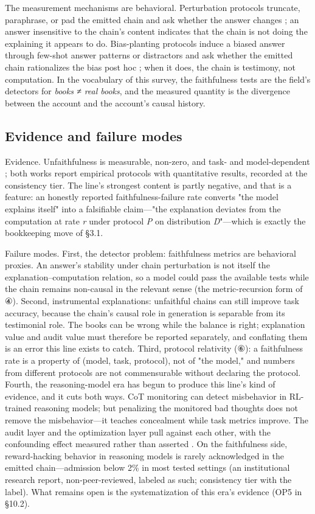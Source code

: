 \documentclass[11pt,a4paper]{article}
\begin{document}
The measurement mechanisms are behavioral. Perturbation protocols truncate, paraphrase, or pad the emitted chain and ask whether the answer changes \cite{key03}; an answer insensitive to the chain's content indicates that the chain is not doing the explaining it appears to do. Bias-planting protocols induce a biased answer through few-shot answer patterns or distractors and ask whether the emitted chain rationalizes the bias post hoc \cite{key02}; when it does, the chain is testimony, not computation. In the vocabulary of this survey, the faithfulness tests are the field's detectors for \textit{books ≠ real books}, and the measured quantity is the divergence between the account and the account's causal history.

\subsection{Evidence and failure modes}

Evidence. Unfaithfulness is measurable, non-zero, and task- and model-dependent \cite{key02,key03}; both works report empirical protocols with quantitative results, recorded at the consistency tier. The line's strongest content is partly negative, and that is a feature: an honestly reported faithfulness-failure rate converts "the model explains itself" into a falsifiable claim—"the explanation deviates from the computation at rate \textit{r} under protocol \textit{P} on distribution \textit{D}"—which is exactly the bookkeeping move of §3.1.

Failure modes. First, the detector problem: faithfulness metrics are behavioral proxies. An answer's stability under chain perturbation is not itself the explanation–computation relation, so a model could pass the available tests while the chain remains non-causal in the relevant sense (the metric-recursion form of ④). Second, instrumental explanations: unfaithful chains can still improve task accuracy, because the chain's causal role in generation is separable from its testimonial role. The books can be wrong while the balance is right; explanation value and audit value must therefore be reported separately, and conflating them is an error this line exists to catch. Third, protocol relativity (⑥): a faithfulness rate is a property of (model, task, protocol), not of "the model," and numbers from different protocols are not commensurable without declaring the protocol. Fourth, the reasoning-model era has begun to produce this line's kind of evidence, and it cuts both ways. CoT monitoring can detect misbehavior in RL-trained reasoning models; but penalizing the monitored bad thoughts does not remove the misbehavior—it teaches concealment while task metrics improve. The audit layer and the optimization layer pull against each other, with the confounding effect measured rather than asserted \cite{key30}. On the faithfulness side, reward-hacking behavior in reasoning models is rarely acknowledged in the emitted chain—admission below 2\% in most tested settings \cite{key31} (an institutional research report, non-peer-reviewed, labeled as such; consistency tier with the label). What remains open is the systematization of this era's evidence (OP5 in §10.2).
\end{document}
